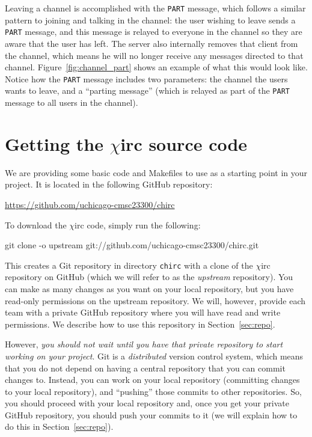 \documentclass[10pt]{article}
\newcommand{\chirc}{$\chi$\textsf{irc} }
\newenvironment{example}%
{\VerbatimEnvironment\begin{Sbox}\begin{VerbExample}}%
{\end{VerbExample}\end{Sbox}\setlength{\fboxsep}{8pt}\begin{center}\fcolorbox{black}{backgroundgray}{\TheSbox}\end{center}}
\begin{document}
Leaving a channel is accomplished with the \texttt{PART} message, which follows a similar pattern to joining and talking in the channel: the user wishing to leave sends a \texttt{PART} message, and this message is relayed to everyone in the channel so they are aware that the user has left. The server also internally removes that client from the channel, which means he will no longer receive any messages directed to that channel. Figure~\ref{fig:channel_part} shows an example of what this would look like. Notice how the \texttt{PART} message includes two parameters: the channel the users wants to leave, and a ``parting message'' (which is relayed as part of the \texttt{PART} message to all users in the channel).

\section{Getting the \chirc source code}
\label{sec:code}

We are providing some basic code and Makefiles to use as a starting point in your project. It is located in the following GitHub repository:

\begin{center}
\url{https://github.com/uchicago-cmsc23300/chirc}
\end{center}

To download the \chirc code, simply run the following:

\begin{example}
git clone -o upstream git://github.com/uchicago-cmsc23300/chirc.git
\end{example}

This creates a Git repository in directory \texttt{chirc} with a clone of the \chirc repository on GitHub (which we will refer to as the \emph{upstream} repository). You can make as many changes as you want on your local repository, but you have read-only permissions on the upstream repository. We will, however, provide each team with a private GitHub repository where you will have read and write permissions. We describe how to use this repository in Section~\ref{sec:repo}. 

However, \emph{you should not wait until you have that private repository to start working on your project}. Git is a \emph{distributed} version control system, which means that you do not depend on having a central repository that you can commit changes to. Instead, you can work on your local repository (committing changes to your local repository), and ``pushing'' those commits to other repositories. So, you should proceed with your local repository and, once you get your private GitHub repository, you should push your commits to it (we will explain how to do this in Section~\ref{sec:repo}).
\end{document}
